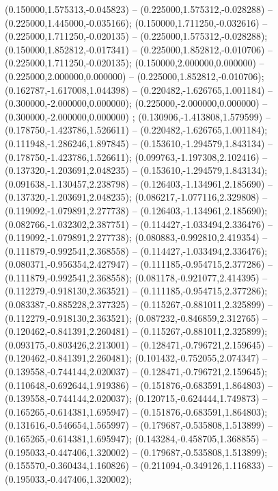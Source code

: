  (0.150000,1.575313,-0.045823) -- (0.225000,1.575312,-0.028288) -- (0.225000,1.445000,-0.035166);
 (0.150000,1.711250,-0.032616) -- (0.225000,1.711250,-0.020135) -- (0.225000,1.575312,-0.028288);
 (0.150000,1.852812,-0.017341) -- (0.225000,1.852812,-0.010706) -- (0.225000,1.711250,-0.020135);
 (0.150000,2.000000,0.000000) -- (0.225000,2.000000,0.000000) -- (0.225000,1.852812,-0.010706);
 (0.162787,-1.617008,1.044398) -- (0.220482,-1.626765,1.001184) -- (0.300000,-2.000000,0.000000);
 (0.225000,-2.000000,0.000000) -- (0.300000,-2.000000,0.000000) ;
 (0.130906,-1.413808,1.579599) -- (0.178750,-1.423786,1.526611) -- (0.220482,-1.626765,1.001184);
 (0.111948,-1.286246,1.897845) -- (0.153610,-1.294579,1.843134) -- (0.178750,-1.423786,1.526611);
 (0.099763,-1.197308,2.102416) -- (0.137320,-1.203691,2.048235) -- (0.153610,-1.294579,1.843134);
 (0.091638,-1.130457,2.238798) -- (0.126403,-1.134961,2.185690) -- (0.137320,-1.203691,2.048235);
 (0.086217,-1.077116,2.329808) -- (0.119092,-1.079891,2.277738) -- (0.126403,-1.134961,2.185690);
 (0.082766,-1.032302,2.387751) -- (0.114427,-1.033494,2.336476) -- (0.119092,-1.079891,2.277738);
 (0.080883,-0.992810,2.419354) -- (0.111879,-0.992541,2.368558) -- (0.114427,-1.033494,2.336476);
 (0.080371,-0.956354,2.427947) -- (0.111185,-0.954715,2.377286) -- (0.111879,-0.992541,2.368558);
 (0.081178,-0.921077,2.414395) -- (0.112279,-0.918130,2.363521) -- (0.111185,-0.954715,2.377286);
 (0.083387,-0.885228,2.377325) -- (0.115267,-0.881011,2.325899) -- (0.112279,-0.918130,2.363521);
 (0.087232,-0.846859,2.312765) -- (0.120462,-0.841391,2.260481) -- (0.115267,-0.881011,2.325899);
 (0.093175,-0.803426,2.213001) -- (0.128471,-0.796721,2.159645) -- (0.120462,-0.841391,2.260481);
 (0.101432,-0.752055,2.074347) -- (0.139558,-0.744144,2.020037) -- (0.128471,-0.796721,2.159645);
 (0.110648,-0.692644,1.919386) -- (0.151876,-0.683591,1.864803) -- (0.139558,-0.744144,2.020037);
 (0.120715,-0.624444,1.749873) -- (0.165265,-0.614381,1.695947) -- (0.151876,-0.683591,1.864803);
 (0.131616,-0.546654,1.565997) -- (0.179687,-0.535808,1.513899) -- (0.165265,-0.614381,1.695947);
 (0.143284,-0.458705,1.368855) -- (0.195033,-0.447406,1.320002) -- (0.179687,-0.535808,1.513899);
 (0.155570,-0.360434,1.160826) -- (0.211094,-0.349126,1.116833) -- (0.195033,-0.447406,1.320002);
